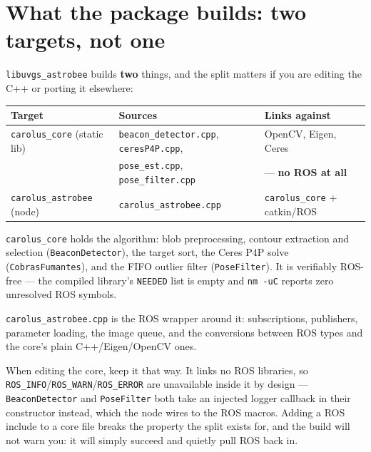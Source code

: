 \documentclass[11pt]{report}
\newenvironment{warningbox}%
  {\begin{lrbox}{\warnbox}\begin{minipage}{0.90\textwidth}}%
  {\end{minipage}\end{lrbox}%
   \begin{center}\fcolorbox{black}{codebg}{\usebox{\warnbox}}\end{center}}
\begin{document}
\section{What the package builds: two targets, not one}
\label{sec:carolus-core}

\texttt{libuvgs\_astrobee} builds \textbf{two} things, and the split matters
if you are editing the C++ or porting it elsewhere:

\begin{center}
\begin{tabular}{@{}lll@{}}
\toprule
\textbf{Target} & \textbf{Sources} & \textbf{Links against} \\
\midrule
\texttt{carolus\_core} (static lib) & \texttt{beacon\_detector.cpp}, \texttt{ceresP4P.cpp}, & OpenCV, Eigen, Ceres \\
                                    & \texttt{pose\_est.cpp}, \texttt{pose\_filter.cpp}      & --- \textbf{no ROS at all} \\
\texttt{carolus\_astrobee} (node)   & \texttt{carolus\_astrobee.cpp}                          & \texttt{carolus\_core} + catkin/ROS \\
\bottomrule
\end{tabular}
\end{center}

\texttt{carolus\_core} holds the algorithm: blob preprocessing, contour
extraction and selection (\texttt{BeaconDetector}), the target sort, the
Ceres P4P solve (\texttt{CobrasFumantes}), and the FIFO outlier filter
(\texttt{PoseFilter}). It is verifiably ROS-free --- the compiled library's
\texttt{NEEDED} list is empty and \texttt{nm -uC} reports zero unresolved
ROS symbols.

\texttt{carolus\_astrobee.cpp} is the ROS wrapper around it: subscriptions,
publishers, parameter loading, the image queue, and the conversions between
ROS types and the core's plain C++/Eigen/OpenCV ones.

\begin{warningbox}
When editing the core, keep it that way. It links no ROS libraries, so
\texttt{ROS\_INFO}/\texttt{ROS\_WARN}/\texttt{ROS\_ERROR} are unavailable
inside it by design --- \texttt{BeaconDetector} and \texttt{PoseFilter} both
take an injected logger callback in their constructor instead, which the node
wires to the ROS macros. Adding a ROS include to a core file breaks the
property the split exists for, and the build will not warn you: it will
simply succeed and quietly pull ROS back in.
\end{warningbox}
\end{document}
